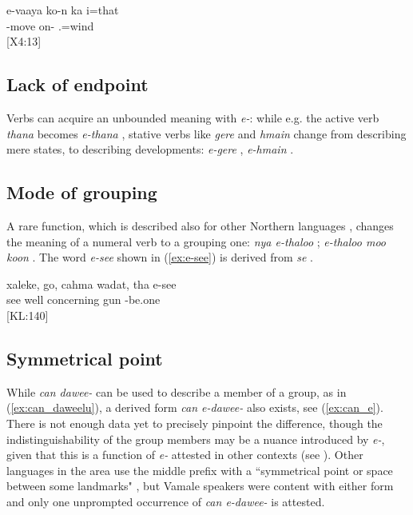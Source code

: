 \ea\label{ex:evaaya}
\gll e-vaaya ko-n ka i=that\\ 
 -move on-  .=wind\\ 
\glt {} {[X4:13]}
\z

\subsection{Lack of endpoint}%
\label{ssec:MID_unbounded}
Verbs can acquire an unbounded meaning with \textit{e-}: while e.g. the active verb \textit{thana}  becomes \textit{e-thana} , stative verbs like \textit{gere}  and \textit{hmain}  change from describing mere states, to describing developments: \textit{e-gere} , \textit{e-hmain} .

\subsection{Mode of grouping}
\label{ssec:MID_grouping}
A rare function, which is described also for other Northern languages \parencite[46]{bril_semantic_2005b}, changes the meaning of a numeral verb to a grouping one: 
\textit{nya e-thaloo} ; 
\textit{e-thaloo moo koon} . The word \textit{e-see}  shown in (\ref{ex:e-see}) is derived from \textit{se} . 

\ea \label{ex:e-see}
\gll xaleke, go, cahma wadat, tha e-see\\ 
 see well concerning gun  -be.one\\ 
\glt {} {[KL:140]}
\z


\subsection{Symmetrical point}%
While \textit{can dawee-}  can be used to describe a member of a group, as in (\ref{ex:can_daweelu}), a derived form \textit{can e-dawee-}  also exists, see (\ref{ex:can_e}). There is not enough data yet to precisely pinpoint the difference, though the indistinguishability of the group members may be a nuance introduced by \textit{e-}, given that this is a function of \textit{e-} attested in other contexts (see ). Other languages in the area use the middle prefix with a ``symmetrical point or space between some landmarks" \parencite[50]{bril_semantic_2005b}, but Vamale speakers were content with either form and only one unprompted occurrence of \textit{can e-dawee-} is attested.


